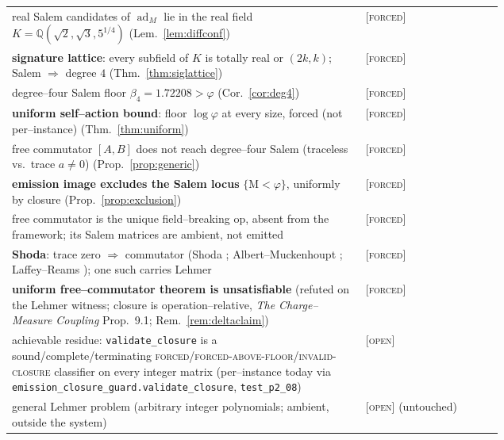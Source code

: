 \documentclass[11pt]{article}
\theoremstyle{plain}
\theoremstyle{definition}
\theoremstyle{remark}
\newcommand{\forced}{\textcolor{forcedc}{\textsc{[forced]}}}
\newcommand{\openq}{\textcolor{openc}{\textsc{[open]}}}
\newcommand{\Q}{\mathbb{Q}}
\newcommand{\Mah}{\mathrm{M}}
\begin{document}
\begin{center}
\begin{tabular}{@{}p{0.72\linewidth}l@{}}
real Salem candidates of $\operatorname{ad}_M$ lie in the real field $K=\Q(\sqrt2,\sqrt3,5^{1/4})$ (Lem.~\ref{lem:diffconf}) & \forced \\
\textbf{signature lattice}: every subfield of $K$ is totally real or $(2k,k)$; Salem $\Rightarrow$ degree $4$ (Thm.~\ref{thm:siglattice}) & \forced \\
degree--four Salem floor $\beta_4=1.72208>\varphi$ (Cor.~\ref{cor:deg4}) & \forced \\
\textbf{uniform self--action bound}: floor $\log\varphi$ at every size, forced (not per--instance) (Thm.~\ref{thm:uniform}) & \forced \\
free commutator $[A,B]$ does not reach degree--four Salem (traceless vs.\ trace $a\ne0$) (Prop.~\ref{prop:generic}) & \forced \\
\textbf{emission image excludes the Salem locus} $\{\Mah<\varphi\}$, uniformly by closure (Prop.~\ref{prop:exclusion}) & \forced \\
free commutator is the unique field--breaking op, absent from the framework; its Salem matrices are ambient, not emitted & \forced \\
\midrule
\textbf{Shoda}: trace zero $\Rightarrow$ commutator (Shoda \cite{Shoda}; Albert--Muckenhoupt \cite{AlbertMuckenhoupt}; Laffey--Reams \cite{LaffeyReams}); one such carries Lehmer & \forced \\
\textbf{uniform free--commutator theorem is unsatisfiable} (refuted on the Lehmer witness; closure is operation--relative, \emph{The Charge--Measure Coupling} Prop.~9.1; Rem.~\ref{rem:deltaclaim}) & \forced \\
achievable residue: \texttt{validate\_closure} is a sound/complete/terminating \textsc{forced}/\textsc{forced-above-floor}/\textsc{invalid-closure} classifier on every integer matrix (per--instance today via \texttt{emission\_closure\_guard.validate\_closure}, \texttt{test\_p2\_08}) & \openq{} \\
\midrule
general Lehmer problem (arbitrary integer polynomials; ambient, outside the system) & \openq{} (untouched) \\
\bottomrule
\end{tabular}
\end{center}
\end{document}
